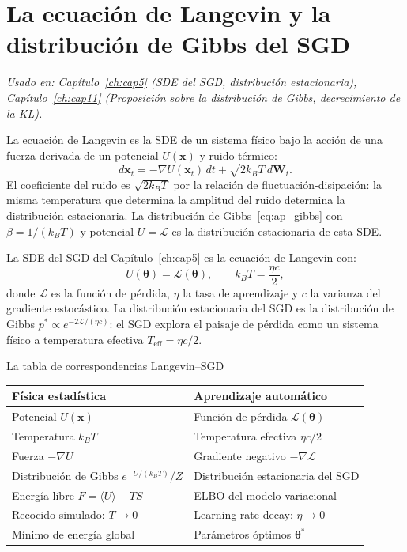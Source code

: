 \section{La ecuación de Langevin y la distribución de Gibbs del SGD}
\label{sec:ap_langevin_gibbs}

\textit{Usado en: Capítulo~\ref{ch:cap5} (SDE del SGD, distribución estacionaria),
Capítulo~\ref{ch:cap11} (Proposición sobre la distribución de Gibbs,
decrecimiento de la KL).}

\medskip
La ecuación de Langevin es la SDE de un sistema físico bajo la acción de una
fuerza derivada de un potencial $U(\bm{x})$ y ruido térmico:
\begin{equation}
  d\bm{x}_t = -\nabla U(\bm{x}_t)\,dt + \sqrt{2k_BT}\,d\bm{W}_t.
  \label{eq:ap_langevin}
\end{equation}
El coeficiente del ruido es $\sqrt{2k_BT}$ por la relación de fluctuación-disipación:
la misma temperatura que determina la amplitud del ruido determina la distribución
estacionaria. La distribución de Gibbs~\eqref{eq:ap_gibbs} con $\beta = 1/(k_BT)$
y potencial $U = \mathcal{L}$ es la distribución estacionaria de esta SDE.

La SDE del SGD del Capítulo~\ref{ch:cap5} es la ecuación de Langevin con:
\[
  U(\bm{\theta}) = \mathcal{L}(\bm{\theta}), \qquad k_BT = \frac{\eta c}{2},
\]
donde $\mathcal{L}$ es la función de pérdida, $\eta$ la tasa de aprendizaje y
$c$ la varianza del gradiente estocástico. La distribución estacionaria del SGD
es la distribución de Gibbs $p^*\propto e^{-2\mathcal{L}/(\eta c)}$: el SGD
explora el paisaje de pérdida como un sistema físico a temperatura efectiva
$T_{\mathrm{eff}} = \eta c/2$.

\begin{observacion}{La tabla de correspondencias Langevin--SGD}
\begin{center}
\begin{tabular}{ll}
\toprule
\textbf{Física estadística} & \textbf{Aprendizaje automático} \\
\midrule
Potencial $U(\bm{x})$ & Función de pérdida $\mathcal{L}(\bm{\theta})$ \\
Temperatura $k_BT$ & Temperatura efectiva $\eta c/2$ \\
Fuerza $-\nabla U$ & Gradiente negativo $-\nabla\mathcal{L}$ \\
Distribución de Gibbs $e^{-U/(k_BT)}/Z$ & Distribución estacionaria del SGD \\
Energía libre $F = \langle U\rangle - TS$ & ELBO del modelo variacional \\
Recocido simulado: $T\to 0$ & Learning rate decay: $\eta\to 0$ \\
Mínimo de energía global & Parámetros óptimos $\bm{\theta}^*$ \\
\bottomrule
\end{tabular}
\end{center}
\end{observacion}

